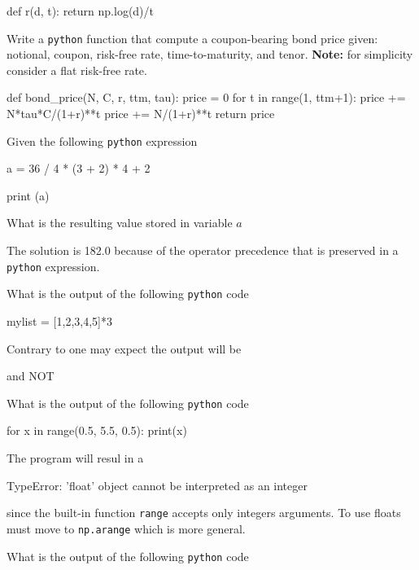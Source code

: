\documentclass[12pt,a4paper]{exam}
\begin{document}
\begin{questions}
\begin{solution}
\begin{ipython}
def r(d, t):
    return np.log(d)/t
  \end{ipython}
\end{solution}
\question
Write a \texttt{python} function that compute a coupon-bearing bond price given: notional, coupon, risk-free rate, time-to-maturity, and tenor.
\textbf{Note:} for simplicity consider a flat risk-free rate.
\fillwithlines{3cm}
\begin{solution}
  \begin{ipython}
def bond_price(N, C, r, ttm, tau):
    price = 0
    for t in range(1, ttm+1):
        price += N*tau*C/(1+r)**t
    price += N/(1+r)**t
    return price    
    \end{ipython}
\end{solution}
\question
Given the following \texttt{python} expression

\begin{ipython}
a = 36 / 4 * (3 +  2) * 4 + 2

print (a)
\end{ipython}

What is the resulting value stored in variable $a$

\begin{checkboxes}
\end{checkboxes}
\begin{solution}
  The solution is 182.0 because of the operator precedence that is preserved in a \texttt{python} expression.
\end{solution}
\question
What is the output of the following \texttt{python} code

\begin{ipython}
mylist = [1,2,3,4,5]*3
\end{ipython}
\fillwithlines{3cm}
\begin{solution}
Contrary to one may expect the output will be
\begin{ioutput}
[1,2,3,4,5,1,2,3,4,5,1,2,3,4,5]
\end{ioutput}
and NOT
\begin{ioutput}
[3,6,9,12,15]
\end{ioutput}
\end{solution}
\question
What is the output of the following \texttt{python} code

\begin{ipython}
for x in range(0.5, 5.5, 0.5):
    print(x)
\end{ipython}
\fillwithlines{3cm}
\begin{solution}
The program will resul in a
\begin{ioutput}
TypeError: 'float' object cannot be interpreted as an integer
\end{ioutput}
since the built-in function \texttt{range} accepts only integers arguments. To use floats must move to \texttt{np.arange} which is more general.
\end{solution}
\question
What is the output of the following \texttt{python} code


\end{questions}
\end{document}

